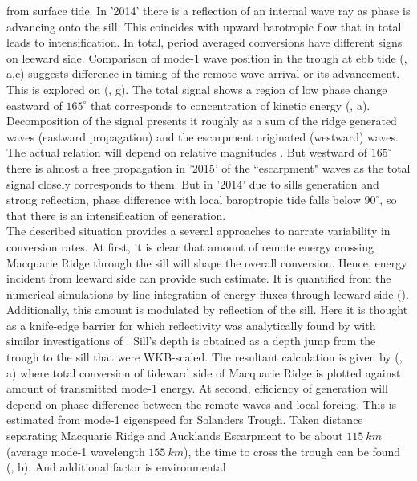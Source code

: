 \documentclass[12pt]{article}
\begin{document}
from surface tide. In '2014' there is a reflection of an internal wave ray as phase is advancing 
onto the sill. This coincides with upward barotropic flow that in total leads to intensification. 
In total, period averaged conversions have different signs on leeward side. Comparison of mode-1 
wave 
position in the trough at ebb tide (, a,c) suggests difference in timing of 
the 
remote wave arrival or its advancement. This is explored on (, g). The total 
signal shows a region of low phase change eastward of $165^{\circ}$ that corresponds to 
concentration of kinetic energy (, a). Decomposition of the signal presents 
it roughly as a sum of the ridge generated waves (eastward propagation) and the escarpment 
originated (westward) waves. The actual relation will depend on relative magnitudes 
\citep{martini2007diagnosing}. 
But westward of $165^{\circ}$ there is almost a free propagation in '2015' of the ``escarpment" 
waves as the total signal closely corresponds to them. But in '2014' due to sills generation and  
strong reflection, phase difference with local baroptropic tide falls below 
$90^{\circ}$, so that there is an intensification of generation.\\
The described situation provides a several approaches to narrate variability in conversion rates. 
At first, it is clear that amount of remote energy crossing Macquarie Ridge through the sill will 
shape the overall conversion. Hence, energy incident from leeward side can provide such 
estimate. It is quantified from the numerical simulations by line-integration of energy fluxes 
through leeward side (). Additionally, this amount is modulated by reflection of 
the 
sill. Here it is thought as a knife-edge barrier for which reflectivity was analytically found by  
\citep{larsen1969internal} with similar investigations of \citep{klymak2013parameterizing}.  
Sill's depth is obtained as a depth jump from the trough to the sill that were WKB-scaled. The 
resultant calculation is given by (, a) where total conversion of tideward 
side 
of Macquarie Ridge is plotted against amount of transmitted mode-1 energy. At second, efficiency 
of generation will depend on phase difference between the remote waves and local forcing. This is 
estimated from mode-1 eigenspeed for Solanders Trough. Taken distance separating Macquarie Ridge 
and Aucklands Escarpment to be about $115~km$ (average mode-1 wavelength $155~km$), the time to 
cross the trough can be found (, b). And additional factor is environmental 
\end{document}
